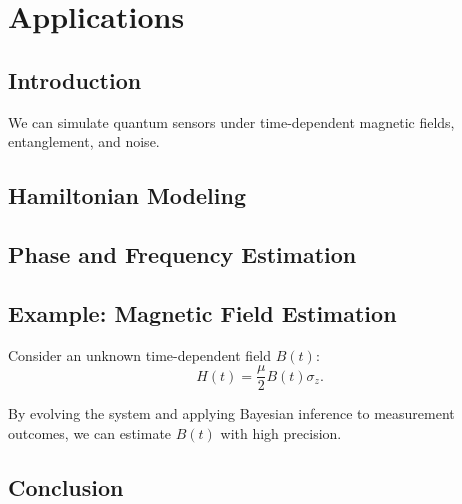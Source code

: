 \chapter{Applications}
\section{Introduction}
We can simulate quantum sensors under time-dependent magnetic fields, entanglement, and noise.
\section{Hamiltonian Modeling}
\section{Phase and Frequency Estimation}
\section{Example: Magnetic Field Estimation}

Consider an unknown time-dependent field $B(t)$:
\[
H(t) = \frac{\mu}{2} B(t) \sigma_z.
\]

By evolving the system and applying Bayesian inference to measurement
outcomes, we can estimate $B(t)$ with high precision.

\section{Conclusion}
